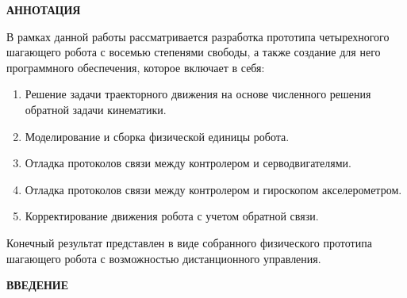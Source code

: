 
\newpage
\begin{center}
	\textbf{АННОТАЦИЯ}
\end{center}

В рамках данной работы рассматривается разработка прототипа четырехногого шагающего робота с восемью степенями свободы, а также создание для него программного обеспечения, которое включает в себя:
\begin{enumerate} 
	\item Решение задачи траекторного движения на основе численного решения обратной задачи кинематики.
	\item Моделирование и сборка физической единицы  робота.
	\item Отладка протоколов связи между контролером и серводвигателями.
	\item Отладка протоколов связи между контролером и гироскопом акселерометром.
	\item Корректирование движения робота с учетом обратной связи.
\end{enumerate}
Конечный результат представлен в виде собранного физического прототипа шагающего робота с возможностью дистанционного управления. 


\onehalfspacing
\setcounter{page}{2}
\renewcommand{\contentsname}{\centerline{\Large{Cодержание}}}
\tableofcontents
{}
\renewcommand{\contentsname}{\centerline{\Large{Cодержание}}}

\newpage
\begin{center}
	\textbf{ВВЕДЕНИЕ}
\end{center}

